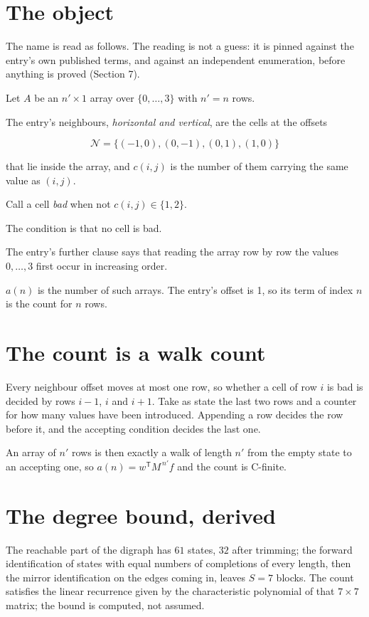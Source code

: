 \documentclass[11pt]{article}
\theoremstyle{definition}
\begin{document}
\section{The object}

The name is read as follows. The reading is not a guess: it is pinned against the entry's own published terms, and against an independent enumeration, before anything is proved (Section 7).

Let $A$ be an $n' \times 1$ array over $\{0,\dots,3\}$ with $n' = n$ rows.

The entry's neighbours, {\itshape horizontal and vertical}, are the cells at the offsets

\[\mathcal{N} = \{(-1,0), (0,-1), (0,1), (1,0)\}\]

that lie inside the array, and $c(i,j)$ is the number of them carrying the same value as $(i,j)$.

Call a cell {\itshape bad} when not $c(i,j) \in \{1, 2\}$.

The condition is that no cell is bad.

The entry's further clause says that reading the array row by row the values $0,\dots,3$ first occur in increasing order.

$a(n)$ is the number of such arrays. The entry's offset is 1, so its term of index $n$ is the count for $n$ rows.

\section{The count is a walk count}

Every neighbour offset moves at most one row, so whether a cell of row $i$ is bad is decided by rows $i-1$, $i$ and $i+1$. Take as state the last two rows and a counter for how many values have been introduced. Appending a row decides the row before it, and the accepting condition decides the last one.

An array of $n'$ rows is then exactly a walk of length $n'$ from the empty state to an accepting one, so $a(n) = w^{\mathsf T}M^{\,n'}f$ and the count is C-finite.

\section{The degree bound, derived}

The reachable part of the digraph has $61$ states, $32$ after trimming; the forward identification of states with equal numbers of completions of every length, then the mirror identification on the edges coming in, leaves $S = 7$ blocks. The count satisfies the linear recurrence given by the characteristic polynomial of that $7\times7$ matrix; the bound is computed, not assumed.
\end{document}
